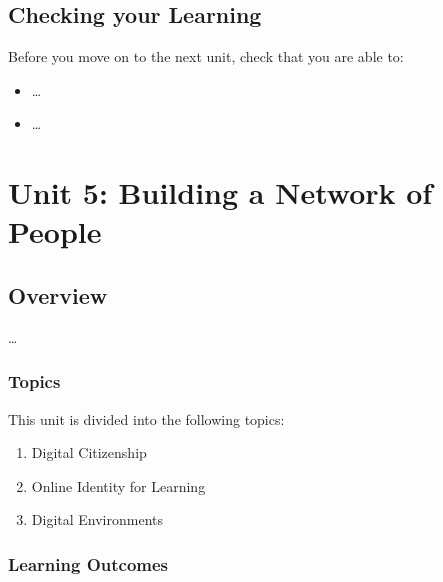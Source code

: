 \documentclass[
]{book}
\providecommand{\tightlist}{%
  \setlength{\itemsep}{0pt}\setlength{\parskip}{0pt}}
\theoremstyle{definition}
\theoremstyle{definition}
\theoremstyle{definition}
\theoremstyle{definition}
\theoremstyle{remark}
\begin{document}
\hypertarget{checking-your-learning-3}{%
\section*{Checking your Learning}\label{checking-your-learning-3}}

\begin{progress}
Before you move on to the next unit, check that you are able to:

\begin{itemize}
\tightlist
\item
  \ldots{}
\item
  \ldots{}
\end{itemize}
\end{progress}

\hypertarget{unit-5-building-a-network-of-people}{%
\chapter{Unit 5: Building a Network of People}\label{unit-5-building-a-network-of-people}}

\hypertarget{overview-4}{%
\section*{Overview}\label{overview-4}}

\ldots{}

\hypertarget{topics-4}{%
\subsection*{Topics}\label{topics-4}}

This unit is divided into the following topics:

\begin{enumerate}
\def\labelenumi{\arabic{enumi}.}
\tightlist
\item
  Digital Citizenship
\item
  Online Identity for Learning
\item
  Digital Environments
\end{enumerate}

\hypertarget{learning-outcomes-4}{%
\subsection*{Learning Outcomes}\label{learning-outcomes-4}}
\end{document}
